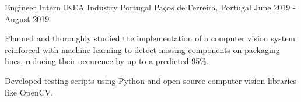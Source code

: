 \begin{cventries}
  \cventry
    {Engineer Intern} %
    {IKEA Industry Portugal} %
    {Paços de Ferreira, Portugal} %
    {June 2019 - August 2019} %
    {
      \begin{cvitems} %
        \item {Planned and thoroughly studied the implementation of a computer vision system reinforced with machine learning to detect missing components on packaging lines, reducing their occurence by up to a predicted 95\%.}
        \item {Developed testing scripts using Python and open source computer vision libraries like OpenCV.}
      \end{cvitems}
    }
   
\end{cventries}
